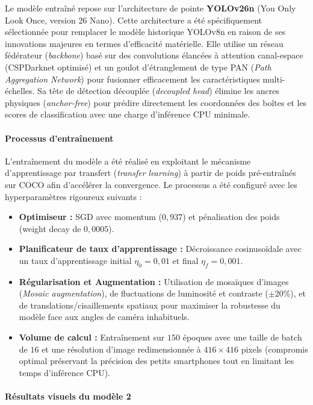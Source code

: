 Le modèle entraîné repose sur l'architecture de pointe \textbf{YOLOv26n} (You Only Look Once, version 26 Nano). Cette architecture a été spécifiquement sélectionnée pour remplacer le modèle historique YOLOv8n en raison de ses innovations majeures en termes d'efficacité matérielle. Elle utilise un réseau fédérateur (\textit{backbone}) basé sur des convolutions élancées à attention canal-espace (CSPDarknet optimisé) et un goulot d'étranglement de type PAN (\textit{Path Aggregation Network}) pour fusionner efficacement les caractéristiques multi-échelles. Sa tête de détection découplée (\textit{decoupled head}) élimine les ancres physiques (\textit{anchor-free}) pour prédire directement les coordonnées des boîtes et les scores de classification avec une charge d'inférence CPU minimale.

\paragraph{Processus d’entraînement}

L'entraînement du modèle a été réalisé en exploitant le mécanisme d'apprentissage par transfert (\textit{transfer learning}) à partir de poids pré-entraînés sur COCO afin d'accélérer la convergence. Le processus a été configuré avec les hyperparamètres rigoureux suivants :
\begin{itemize}
    \item \textbf{Optimiseur :} SGD avec momentum ($0,937$) et pénalisation des poids (weight decay de $0,0005$).
    \item \textbf{Planificateur de taux d'apprentissage :} Décroissance cosinusoïdale avec un taux d'apprentissage initial $\eta_0 = 0,01$ et final $\eta_{f} = 0,001$.
    \item \textbf{Régularisation et Augmentation :} Utilisation de mosaïques d'images (\textit{Mosaic augmentation}), de fluctuations de luminosité et contraste ($\pm 20\%$), et de translations/cisaillements spatiaux pour maximiser la robustesse du modèle face aux angles de caméra inhabituels.
    \item \textbf{Volume de calcul :} Entraînement sur $150$ époques avec une taille de batch de $16$ et une résolution d'image redimensionnée à $416 \times 416$ pixels (compromis optimal préservant la précision des petits smartphones tout en limitant les temps d'inférence CPU).
\end{itemize}

\paragraph{Résultats visuels du modèle 2}

